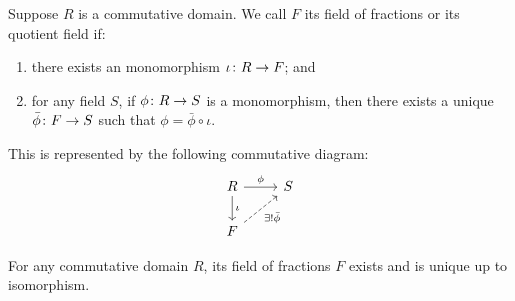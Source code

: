 \begin{definition}
    Suppose \(R\) is a commutative domain.
    We call \(F\) its field of fractions or its quotient field if:
    \begin{enumerate}[label={(\roman*)}, itemsep=0mm]
        \item there exists an monomorphism \(\iota\colon R\to F\); and
        \item for any field \(S\), if \(\phi\colon R\to S\) is a monomorphism,
            then there exists a unique \(\bar{\phi}\colon F\to S\)
            such that \(\phi = \bar{\phi}\circ\iota\).
    \end{enumerate}
    This is represented by the following commutative diagram:
    \begin{equation*}
        \begin{tikzcd}
            R \arrow{r}{\phi} \arrow{d}{\iota} & S \\
            F \arrow[dashrightarrow]{ru}[swap]{\exists! \bar{\phi}}
        \end{tikzcd}
    \end{equation*}
\end{definition}
\begin{theorem}\label{thm:existence-field-of-fractions}
    For any commutative domain \(R\),
    its field of fractions \(F\) exists and is unique up to isomorphism.
\end{theorem}
